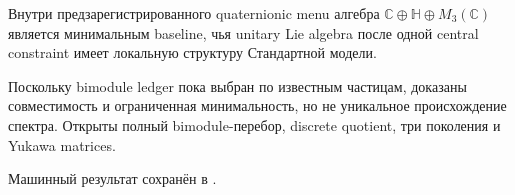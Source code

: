 \begin{theorem}
Внутри предзарегистрированного quaternionic menu алгебра
\(\mathbb C\oplus\mathbb H\oplus M_3(\mathbb C)\) является минимальным
baseline, чья unitary Lie algebra после одной central constraint имеет
локальную структуру Стандартной модели.
\end{theorem}

\begin{nogocriterion}
Поскольку bimodule ledger пока выбран по известным частицам, доказаны
совместимость и ограниченная минимальность, но не уникальное происхождение
спектра. Открыты полный bimodule-перебор, discrete quotient, три поколения и
Yukawa matrices.
\end{nogocriterion}

Машинный результат сохранён в
.